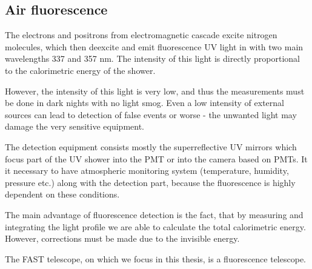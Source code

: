 \subsection{Air fluorescence}
The electrons and positrons from electromagnetic cascade excite nitrogen molecules, which then deexcite and emit fluorescence UV light in with two main wavelengths 337 and 357 nm. The intensity of this light is directly proportional to the calorimetric energy of the shower.
\par
However, the intensity of this light is very low, and thus the measurements must be done in dark nights with no light smog. Even a low intensity of external sources can lead to detection of false events or worse - the unwanted light may damage the very sensitive equipment. 
\par
The detection equipment consists mostly the superreflective UV mirrors which focus part of the UV shower into the PMT or into the camera based on PMTs. It it necessary to have atmospheric monitoring system (temperature, humidity, pressure etc.) along with the detection part, because the fluorescence is highly dependent on these conditions.  
\par
The main advantage of fluorescence detection is the fact, that by measuring and integrating the light profile we are able to calculate the total calorimetric energy. However, corrections must be made due to the invisible energy.

\par
The FAST telescope, on which we focus in this thesis, is a fluorescence telescope.
